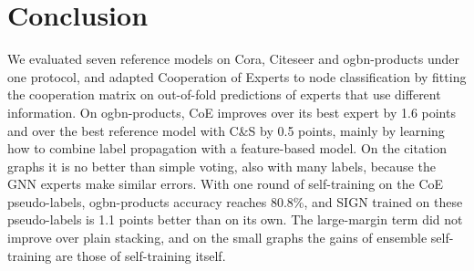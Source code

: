 \documentclass[sigconf,nonacm]{acmart}
\begin{document}
\section{Conclusion}

We evaluated seven reference models on Cora, Citeseer and ogbn-products under one protocol, and adapted Cooperation of Experts to node classification by fitting the cooperation matrix on out-of-fold predictions of experts that use different information.
On ogbn-products, CoE improves over its best expert by 1.6 points and over the best reference model with C\&S by 0.5 points, mainly by learning how to combine label propagation with a feature-based model.
On the citation graphs it is no better than simple voting, also with many labels, because the GNN experts make similar errors.
With one round of self-training on the CoE pseudo-labels, ogbn-products accuracy reaches 80.8\%, and SIGN trained on these pseudo-labels is 1.1 points better than on its own.
The large-margin term did not improve over plain stacking, and on the small graphs the gains of ensemble self-training are those of self-training itself.



\end{document}
